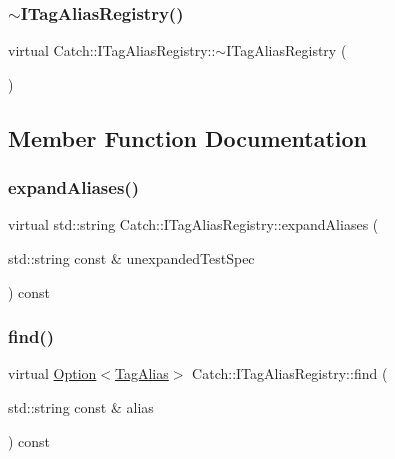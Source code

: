 \subsubsection{\texorpdfstring{$\sim$\+I\+Tag\+Alias\+Registry()}{~ITagAliasRegistry()}}
{\footnotesize\ttfamily virtual Catch\+::\+I\+Tag\+Alias\+Registry\+::$\sim$\+I\+Tag\+Alias\+Registry (\begin{DoxyParamCaption}{ }\end{DoxyParamCaption})\hspace{0.3cm}{\ttfamily [virtual]}}



\subsection{Member Function Documentation}
\hypertarget{struct_catch_1_1_i_tag_alias_registry_ae729a7532faf7466db1a157ce0395170}{}\label{struct_catch_1_1_i_tag_alias_registry_ae729a7532faf7466db1a157ce0395170} 
\subsubsection{\texorpdfstring{expand\+Aliases()}{expandAliases()}}
{\footnotesize\ttfamily virtual std\+::string Catch\+::\+I\+Tag\+Alias\+Registry\+::expand\+Aliases (\begin{DoxyParamCaption}\item[{std\+::string const \&}]{unexpanded\+Test\+Spec }\end{DoxyParamCaption}) const\hspace{0.3cm}{\ttfamily [pure virtual]}}

\hypertarget{struct_catch_1_1_i_tag_alias_registry_a7d2fba4d39cfcc62c2695fcde4f989c3}{}\label{struct_catch_1_1_i_tag_alias_registry_a7d2fba4d39cfcc62c2695fcde4f989c3} 
\subsubsection{\texorpdfstring{find()}{find()}}
{\footnotesize\ttfamily virtual \hyperlink{class_catch_1_1_option}{Option}$<$\hyperlink{struct_catch_1_1_tag_alias}{Tag\+Alias}$>$ Catch\+::\+I\+Tag\+Alias\+Registry\+::find (\begin{DoxyParamCaption}\item[{std\+::string const \&}]{alias }\end{DoxyParamCaption}) const\hspace{0.3cm}{\ttfamily [pure virtual]}}

